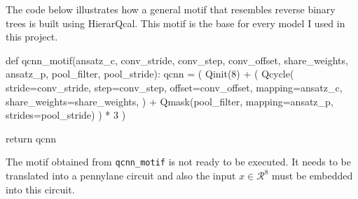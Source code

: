 \documentclass[
  13pt,
  a4paper,
  DIV=11,
  numbers=noendperiod]{scrreprt}
\newenvironment{Shaded}{\begin{snugshade}}{\end{snugshade}}
\newcommand{\ControlFlowTok}[1]{\textcolor[rgb]{0.00,0.23,0.31}{#1}}
\newcommand{\DecValTok}[1]{\textcolor[rgb]{0.68,0.00,0.00}{#1}}
\newcommand{\KeywordTok}[1]{\textcolor[rgb]{0.00,0.23,0.31}{#1}}
\newcommand{\NormalTok}[1]{\textcolor[rgb]{0.00,0.23,0.31}{#1}}
\newcommand{\OperatorTok}[1]{\textcolor[rgb]{0.37,0.37,0.37}{#1}}
\begin{document}
The code below illustrates how a general motif that resembles reverse
binary trees is built using HierarQcal. This motif is the base for every
model I used in this project.

\begin{Shaded}
\begin{Highlighting}[numbers=left,,]
\KeywordTok{def}\NormalTok{ qcnn\_motif(ansatz\_c, conv\_stride, conv\_step, conv\_offset, share\_weights, ansatz\_p, pool\_filter, pool\_stride):}
\NormalTok{    qcnn }\OperatorTok{=}\NormalTok{ (}
\NormalTok{        Qinit(}\DecValTok{8}\NormalTok{)}
        \OperatorTok{+}\NormalTok{ (}
\NormalTok{            Qcycle(}
\NormalTok{                stride}\OperatorTok{=}\NormalTok{conv\_stride,}
\NormalTok{                step}\OperatorTok{=}\NormalTok{conv\_step,}
\NormalTok{                offset}\OperatorTok{=}\NormalTok{conv\_offset,}
\NormalTok{                mapping}\OperatorTok{=}\NormalTok{ansatz\_c,}
\NormalTok{                share\_weights}\OperatorTok{=}\NormalTok{share\_weights,}
\NormalTok{            )}
            \OperatorTok{+}\NormalTok{ Qmask(pool\_filter, mapping}\OperatorTok{=}\NormalTok{ansatz\_p, strides}\OperatorTok{=}\NormalTok{pool\_stride)}
\NormalTok{        )}
        \OperatorTok{*} \DecValTok{3}
\NormalTok{    )}

    \ControlFlowTok{return}\NormalTok{ qcnn}
\end{Highlighting}
\end{Shaded}

The motif obtained from \texttt{qcnn\_motif} is not ready to be
executed. It needs to be translated into a pennylane circuit and also
the input \(x \in \mathcal{R}^8\) must be embedded into this circuit.
\end{document}
